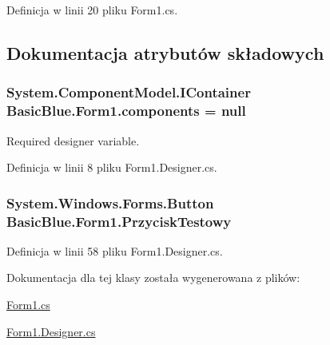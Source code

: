 Definicja w linii 20 pliku Form1.\-cs.



\subsection{Dokumentacja atrybutów składowych}
\hypertarget{class_basic_blue_1_1_form1_a67797619d997e847f8262b5e26354f36}{
\subsubsection[{components}]{\setlength{\rightskip}{0pt plus 5cm}System.\-Component\-Model.\-I\-Container Basic\-Blue.\-Form1.\-components = null\hspace{0.3cm}{\ttfamily [private]}}}\label{class_basic_blue_1_1_form1_a67797619d997e847f8262b5e26354f36}


Required designer variable. 



Definicja w linii 8 pliku Form1.\-Designer.\-cs.

\hypertarget{class_basic_blue_1_1_form1_a493784dd519c0eb40994747e3d255674}{
\subsubsection[{Przycisk\-Testowy}]{\setlength{\rightskip}{0pt plus 5cm}System.\-Windows.\-Forms.\-Button Basic\-Blue.\-Form1.\-Przycisk\-Testowy\hspace{0.3cm}{\ttfamily [private]}}}\label{class_basic_blue_1_1_form1_a493784dd519c0eb40994747e3d255674}


Definicja w linii 58 pliku Form1.\-Designer.\-cs.



Dokumentacja dla tej klasy została wygenerowana z plików\-:\begin{DoxyCompactItemize}
\item 
\hyperlink{_form1_8cs}{Form1.\-cs}\item 
\hyperlink{_form1_8_designer_8cs}{Form1.\-Designer.\-cs}\end{DoxyCompactItemize}
